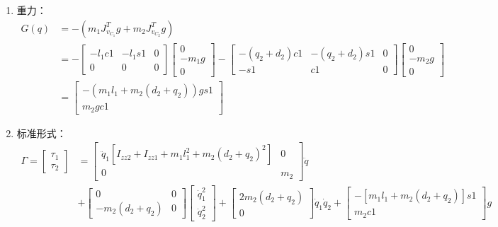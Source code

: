 \documentclass[
12pt, %
a4paper, 
oneside, %
headinclude,footinclude, %
]{scrartcl}
\begin{document}
{\begin{enumerate}
\item 重力：
\begin{align*}
G(q) &= -(m_1 J_{v_{C_1}}^T g + m_2 J_{v_{C_2}}^T g) \\
&= -\begin{bmatrix} -l_1 c1 & -l_1 s1 & 0 \\ 0 & 0 & 0 \end{bmatrix} \begin{bmatrix} 0 \\ -m_1 g \\ 0 \end{bmatrix} - \begin{bmatrix} -(q_2 + d_2)c1 & -(q_2 + d_2)s1 & 0 \\ -s1 & c1 & 0 \end{bmatrix} \begin{bmatrix} 0 \\ -m_2 g \\ 0 \end{bmatrix} \\
&= \begin{bmatrix} -(m_1 l_1 + m_2(d_2 + q_2))g s1 \\ m_2 g c1 \end{bmatrix}
\end{align*}
\item 标准形式：
\begin{align*}
\Gamma = \begin{bmatrix} \tau_1 \\ \tau_2 \end{bmatrix} 
&= \begin{bmatrix} \ddot{q}_1[I_{zz2} + I_{zz1} + m_1l_1^2 + m_2(d_2 + q_2)^2] & 0 \\ 0 & m_2 \end{bmatrix} \ddot{q} \\
&+ \begin{bmatrix} 0 & 0 \\ -m_2(d_2 + q_2) & 0 \end{bmatrix} \begin{bmatrix} \dot{q}_1^2\\ \dot{q}_2^2 \end{bmatrix} 
+ \begin{bmatrix} 2m_2(d_2 + q_2) \\ 0 \end{bmatrix} \dot{q}_1\dot{q}_2 
+ \begin{bmatrix} - [m_1l_1 + m_2(d_2 + q_2)]s1 \\ m_2c1 \end{bmatrix} g 
\end{align*}
\end{enumerate}
}
\end{document}
